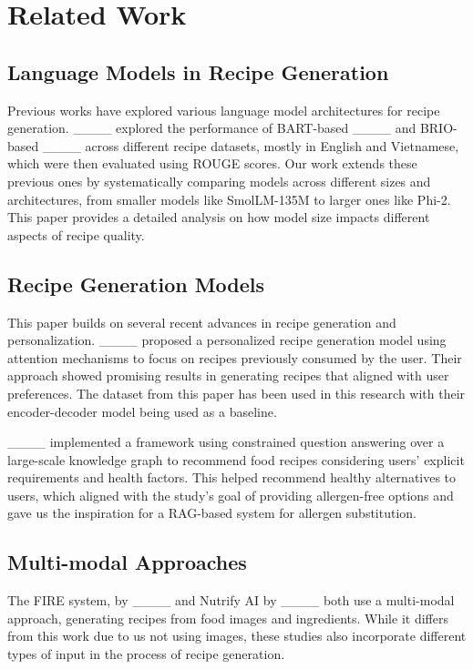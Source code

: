 \section{Related Work}
\subsection{Language Models in Recipe Generation}
Previous works have explored various language model architectures for recipe generation. ____ explored the performance of BART-based ____ and BRIO-based ____ across different recipe datasets, mostly in English and Vietnamese, which were then evaluated using ROUGE scores. Our work extends these previous ones by systematically comparing models across different sizes and architectures, from smaller models like SmolLM-135M to larger ones like Phi-2. This paper provides a detailed analysis on how model size impacts different aspects of recipe quality. 

\subsection{Recipe Generation Models}
This paper builds on several recent advances in recipe generation and personalization. ____ proposed a personalized recipe generation model using attention mechanisms to focus on recipes previously consumed by the user. Their approach showed promising results in generating recipes that aligned with user preferences. The dataset from this paper has been used in this research with their encoder-decoder model being used as a baseline.

____ implemented a framework using constrained question answering over a large-scale knowledge graph to recommend food recipes considering users' explicit requirements and health factors. This helped recommend healthy alternatives to users, which aligned with the study's goal of providing allergen-free options and gave us the inspiration for a RAG-based system for allergen substitution. 

\subsection{Multi-modal Approaches}
The FIRE system, by ____ and Nutrify AI by ____ both use a multi-modal approach, generating recipes from food images and ingredients. While it differs from this work due to us not using images, these studies also incorporate different types of input in the process of recipe generation.

